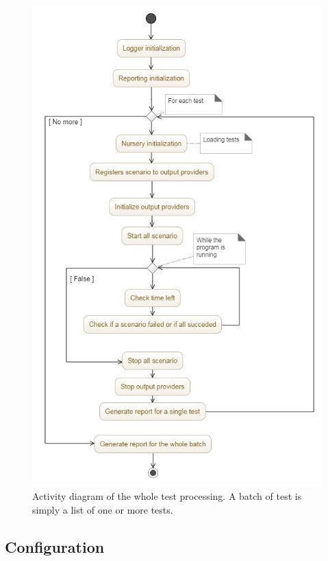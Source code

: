 \documentclass[12pt]{article}
\theoremstyle{definition}
\theoremstyle{definition}
\theoremstyle{remark}
\begin{document}
\begin{figure}
    \centering
    \includegraphics[scale=0.5]{activity_diagram.png}
    \caption{Activity diagram of the whole test processing. A batch of test is simply a list of one or more tests.}
    \label{activity_diagram}
\end{figure}


\subsection{Configuration}
\end{document}
